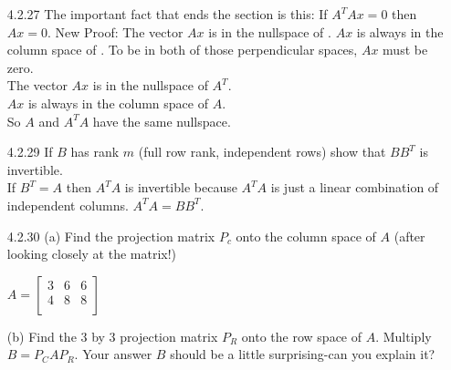 \documentclass[10pt,twoside,reqno]{article}
\begin{document}
\begin{enumerate}
\begin{center}
\end{center}
\vspace{3mm}
\item[4.2.27] The important fact that ends the section is this: If $A^TAx = 0$ then $Ax = 0$. New Proof: The vector $Ax$ is in the nullspace of \underline{\hspace{8mm}}. $Ax$ is always in the column space of \underline{\hspace{8mm}}. To be in both of those perpendicular spaces, $Ax$ must be zero. \\
\vspace{3mm}
{\addtolength{\leftskip}{10mm}
The vector $Ax$ is in the nullspace of \underline{\hspace{3mm}$A^T$\hspace{3mm}}. \\
$Ax$ is always in the column space of \underline{\hspace{3mm}$A$\hspace{3mm}}. \\
So $A$ and $A^TA$ have the same nullspace. \\
}
\vspace{3mm}
\item[4.2.29] If $B$ has rank $m$ (full row rank, independent rows) show that $BB^T$ is invertible. \\
\vspace{3mm}
{\addtolength{\leftskip}{10mm}
If $B^T=A$ then $A^TA$ is invertible because $A^TA$ is just a linear combination of independent columns. $A^TA=BB^T$. \\
}
\vspace{3mm}
\item[4.2.30] (a) Find the projection matrix $P_c$ onto the column space of $A$ (after looking closely at the matrix!) \\
\begin{center}
$
A=
\begin{bmatrix}
3&6&6\\
4&8&8\\
\end{bmatrix}
$
\end{center}
 (b) Find the 3 by 3 projection matrix $P_R$ onto the row space of $A$. Multiply $B = P_CAP_R$. Your answer $B$ should be a little surprising-can you explain it?  \\

\end{enumerate}
\end{document}

